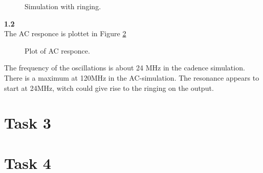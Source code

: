 \documentclass[a4paper,english,11pt]{article}
\begin{document}
\begin{figure}[!htbp]
 \centering
  \caption{Simulation with ringing.}
  \label{fig:sim:ring}	
\end{figure}
\newpage
\textbf{1.2}\\
The AC responce is plottet in Figure \ref{fig:ac:responce}\\
\begin{figure}[!htbp]
 \centering
  \caption{Plot of AC responce.}
  \label{fig:ac:responce}	
\end{figure}

The frequency of the oscillations is about 24 MHz in the cadence simulation. There is a maximum at 120MHz in the AC-simulation. The   resonance appears to start at 24MHz, witch could give rise to the ringing on the output. 

\section{Task 3}

\section{Task 4}
\end{document}
